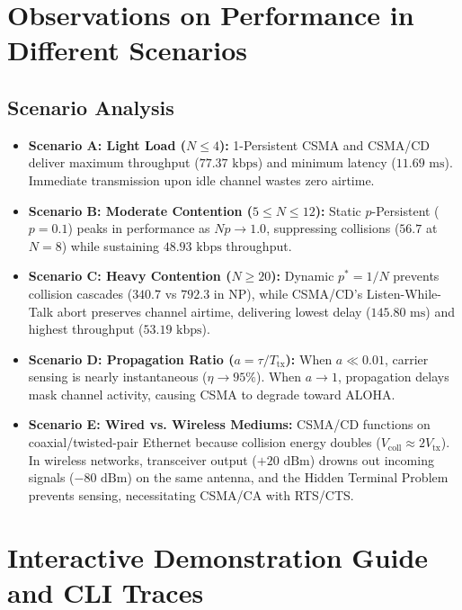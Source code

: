 \documentclass[11pt,a4paper]{article}
\begin{document}
\newpage

\section{Observations on Performance in Different Scenarios}

\subsection{Scenario Analysis}
\begin{itemize}
    \item \textbf{Scenario A: Light Load ($N \le 4$):} 1-Persistent CSMA and CSMA/CD deliver maximum throughput ($77.37\text{ kbps}$) and minimum latency ($11.69\text{ ms}$). Immediate transmission upon idle channel wastes zero airtime.
    \item \textbf{Scenario B: Moderate Contention ($5 \le N \le 12$):} Static $p$-Persistent ($p=0.1$) peaks in performance as $N p \to 1.0$, suppressing collisions ($56.7$ at $N=8$) while sustaining $48.93\text{ kbps}$ throughput.
    \item \textbf{Scenario C: Heavy Contention ($N \ge 20$):} Dynamic $p^* = 1/N$ prevents collision cascades ($340.7$ vs $792.3$ in NP), while CSMA/CD's Listen-While-Talk abort preserves channel airtime, delivering lowest delay ($145.80\text{ ms}$) and highest throughput ($53.19\text{ kbps}$).
    \item \textbf{Scenario D: Propagation Ratio ($a = \tau / T_{\text{tx}}$):} When $a \ll 0.01$, carrier sensing is nearly instantaneous ($\eta \to 95\%$). When $a \to 1$, propagation delays mask channel activity, causing CSMA to degrade toward ALOHA.
    \item \textbf{Scenario E: Wired vs. Wireless Mediums:} CSMA/CD functions on coaxial/twisted-pair Ethernet because collision energy doubles ($V_{\text{coll}} \approx 2 V_{\text{tx}}$). In wireless networks, transceiver output ($+20\text{ dBm}$) drowns out incoming signals ($-80\text{ dBm}$) on the same antenna, and the Hidden Terminal Problem prevents sensing, necessitating CSMA/CA with RTS/CTS.
\end{itemize}

\section{Interactive Demonstration Guide and CLI Traces}
\end{document}
